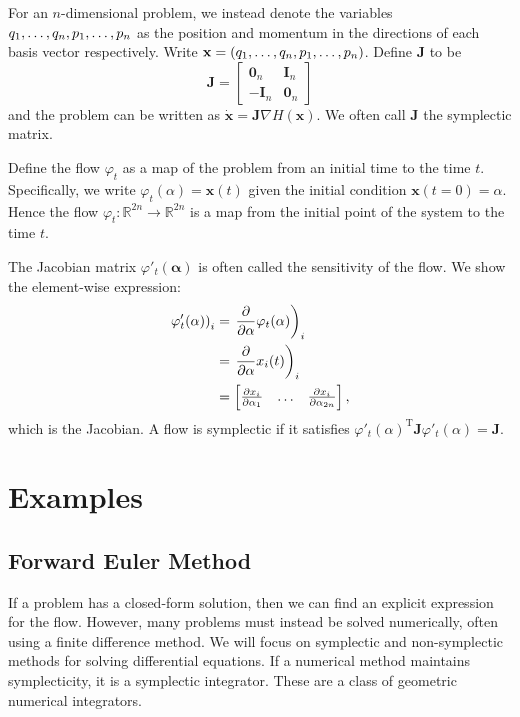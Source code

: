 \documentclass{report}
\begin{document}
For an $n$-dimensional problem,
we instead denote the variables $q_1, \mathellipsis, q_n, p_1, \mathellipsis, p_n$ as the position and momentum in the directions of each basis vector respectively.
Write $\mathbf{x} = (q_1, \mathellipsis, q_n, p_1, \mathellipsis, p_n)$.
Define $\mathbf{J}$ to be
\begin{equation}
	\mathbf{J} = \begin{bmatrix}
		\mathbf{0}_n & \mathbf{I}_n \\
		-\mathbf{I}_n & \mathbf{0}_n
	\end{bmatrix}
\end{equation}
and the problem can be written as $\mathbf{\dot{x}} = \mathbf{J}\nabla H(\mathbf{x})$.
We often call $\mathbf{J}$ the symplectic matrix.

Define the flow $\varphi_t$ as a map of the problem from an initial time to the time $t$.
Specifically, we write $\varphi_t(\alpha) = \mathbf{x}(t)$ given the initial condition $\mathbf{x}(t=0) = \alpha$. Hence the flow $\varphi_t:\mathds{R}^{2n}\rightarrow \mathds{R}^{2n}$ is a map from the initial point of the system to the time $t$.

The Jacobian matrix $\varphi'_t(\mathbf{\alpha})$ is often called the sensitivity of the flow.
We show the element-wise expression:
\begin{align*}
	\left. \varphi'_t(\alpha) \right)_i &= \left. \frac{\partial}{\partial \alpha} \varphi_t(\alpha) \right)_i \\
	&= \left. \frac{\partial}{\partial \alpha} x_i(t) \right)_i \\
	&= \begin{bmatrix}
		\frac{\partial x_i}{\partial \alpha_1} & \mathellipsis & \frac{\partial x_i}{\partial \alpha_{2n}}
	\end{bmatrix},
\end{align*}
which is the Jacobian.
A flow is symplectic if it satisfies $\varphi'_t(\alpha)^\mathrm{T} \mathbf{J} \varphi'_t(\alpha) = \mathbf{J}.$

\section{Examples}
\subsection{Forward Euler Method}

If a problem has a closed-form solution, then we can find an explicit expression for the flow.
However, many problems must instead be solved numerically, often using a finite difference method.
We will focus on symplectic and non-symplectic methods for solving differential equations.
If a numerical method maintains symplecticity, it is a symplectic integrator.
These are a class of geometric numerical integrators.
\end{document}
